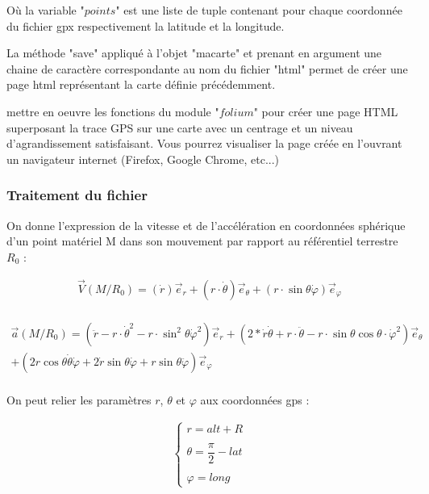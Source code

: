 Où la variable "$points$" est une liste de tuple contenant pour chaque coordonnée du fichier gpx respectivement la latitude et la longitude.

La méthode "save" appliqué à l'objet "macarte" et prenant en argument une chaine de caractère correspondante au nom du fichier "html" permet de créer une page html représentant la carte définie précédemment.

\question{} mettre en oeuvre les fonctions du module "$folium$" pour créer une page HTML superposant la trace GPS sur une carte avec un centrage et un niveau d'agrandissement satisfaisant. Vous pourrez visualiser la page créée en l'ouvrant un navigateur internet (Firefox, Google Chrome, etc...)


\subsubsection{Traitement du fichier}

On donne l'expression de la vitesse et de l'accélération en coordonnées sphérique d'un point matériel M dans son mouvement par rapport au référentiel terrestre $R_0$ : 

\begin{align*}
\overrightarrow{V}(M/R_0)=\left(\dot{r}\right)\overrightarrow{e}_r+\left(r\cdot \dot{\theta}\right)\overrightarrow{e}_{\theta}+\left(r\cdot \sin\theta\dot{\varphi}\right)\overrightarrow{e}_{\varphi}\\
\end{align*}

\begin{align*}
\overrightarrow{a}(M/R_0)=\left(\ddot{r}-r\cdot \dot{\theta}^2-r\cdot \sin^2\theta\dot{\varphi}^2\right)\overrightarrow{e}_r+\left(2*\dot{r}\dot{\theta}+r\cdot \ddot{\theta}-r\cdot \sin\theta\cos\theta\cdot \dot{\varphi}^2\right)\overrightarrow{e}_{\theta}\\
+
\left(2 r\cos\theta\dot{\theta}\dot{\varphi}+2\dot{r}\sin\theta\dot{\varphi}+r\sin\theta\ddot{\varphi}\right)\overrightarrow{e}_{\varphi}\\
\end{align*}

On peut relier les paramètres $r$, $\theta$ et $\varphi$ aux coordonnées gps : 

\begin{align*}
\left\{
\begin{array}{c}
r=alt+R\\
\\
\theta=\dfrac{\pi}{2}-lat\\
\\
\varphi=long
\end{array}
\right.
\end{align*}

